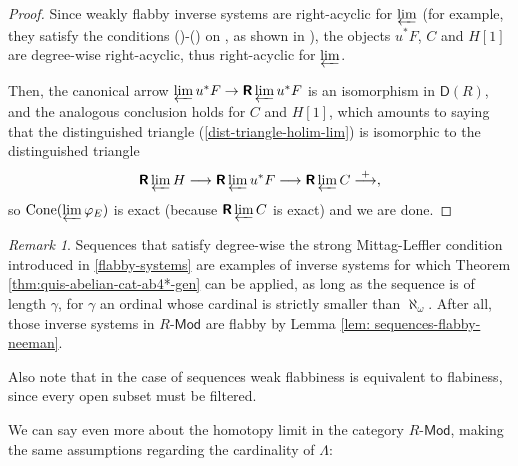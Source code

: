 \documentclass[reqno,11pt]{amsart}
\theoremstyle{plain}
\newtheorem{cor}[thm]{Corollary}
\theoremstyle{remark}
\newtheorem*{rem}{Remark}
\theoremstyle{definition}
\numberwithin{equation}{thm}
\newcommand{\SA}{\mathsf{A}}
\newcommand{\CCC}{\boldsymbol{\mathsf{C}}}
\newcommand{\D}{\boldsymbol{\mathsf{D}}}
\newcommand{\R}{\boldsymbol{\mathsf{R}}}
\newcommand{\holim}[1]{\begin{array}[t]{c} {\rm holim}\\[-7.5 pt]
		{\longleftarrow} \end{array}}
\newcommand{\lto}{\longrightarrow}
\newcommand{\md}{\text{-}\mathsf{Mod}}
\DeclareMathOperator{\cone}{Cone}
\begin{document}
\begin{proof}
		Since weakly flabby inverse systems are right-acyclic for $\varprojlim$ (for example, they satisfy the conditions ()-() on \cite[Proposition 2.7.2.]{yellow}, as shown in \cite[\S 1]{jensen}), the objects $u^*F$, $C$ and $H[1]$ are degree-wise right-acyclic, thus right-acyclic for $\varprojlim$. 
		
		Then, the canonical arrow $\varprojlim u^*F \to \R\varprojlim u^*F$ is an isomorphism in $\D(R)$, and the analogous conclusion holds for $C$ and $H[1]$, which amounts to saying that the distinguished triangle (\ref{dist-triangle-holim-lim}) is isomorphic to the distinguished triangle
		\begin{equation}\label{rlim-triangle}
			\R\varprojlim H \lto \R\varprojlim u^*F \lto \R\varprojlim C \overset{+}{\lto},
		\end{equation}
		so $\cone(\varprojlim \varphi_E)$ is exact (because $\R\varprojlim C$ is exact) and we are done.
	\end{proof}
	

	\begin{rem}
		Sequences that satisfy degree-wise the strong Mittag-Leffler condition introduced in \ref{flabby-systems} are examples of inverse systems for which Theorem \ref{thm:quis-abelian-cat-ab4*-gen} can be applied, as long as the sequence is of length $\gamma$, for $\gamma$ an ordinal whose cardinal is strictly smaller than $\aleph_\omega$. After all, those inverse systems in $R\md$ are flabby by Lemma \ref{lem: sequences-flabby-neeman}. 
		
		Also note that in the case of sequences weak flabbiness is equivalent to flabiness, since every open subset must be filtered.
	\end{rem}
	
	We can say even more about the homotopy limit in the category $R\md$, making the same assumptions regarding the cardinality of $\Lambda$:
	
\end{document}
